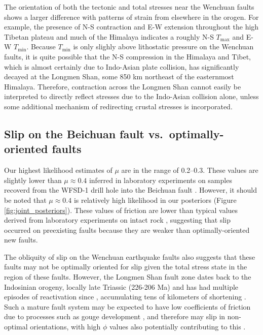 \documentclass[twocolumn,jgrga]{AGUTeX}
\begin{document}
\begin{article}
The orientation of both the tectonic and total stresses near the
Wenchuan faults shows a larger difference with patterns of strain from
elsewhere in the orogen. For example, the presence of N-S contraction
and E-W extension throughout the high Tibetan plateau and much of the
Himalaya \citep[e.g.,][]{armijo1986, molnar1988, taylor2003} indicates a
roughly N-S $T_{\mathrm{max}}$ and E-W $T_{\mathrm{min}}$. Because
$T_{\mathrm{min}}$ is only slighly above lithostatic pressure on the
Wenchuan faults, it is quite possible that the N-S compression in the
Himalaya and Tibet, which is almost certainly due to Indo-Asian plate
collision, has significantly decayed at the Longmen Shan, some 850
km northeast of the easternmost Himalaya. Therefore, contraction across
the Longmen Shan cannot easily be interpreted to directly reflect
stresses due to the Indo-Asian collision alone, unless some additional
mechanism of redirecting crustal stresses is incorporated.

\subsection{Slip on the Beichuan fault vs.~optimally-oriented
faults}\label{slip-on-the-beichuan-fault-vs.optimally-oriented-faults}

Our highest likelihood estimates of $\mu$ are in the range of 0.2--0.3.
These values are slightly lower than $\mu \approx 0.4$ inferred in
laboratory experiments on samples recoverd from the WFSD-1 drill hole
into the Beichuan fault \citep{kuo2014}. However, it should be noted that
$\mu \approx 0.4$ is relatively high likelihood in our posteriors
(Figure \ref{fig:joint_posteriors}). These values of friction 
are lower than typical values derived from laboratory experiments on
intact rock \citep[e.g.,][]{byerlee1978}, suggesting that slip occurred on
preexisting faults because they are weaker than optimally-oriented new
faults.

The obliquity of slip on the Wenchuan earthquake faults also suggests
that these faults may not be optimally oriented for slip given the total
stress state in the region of these faults. However, the Longmen Shan
fault zone dates back to the Indosinian orogeny, locally late Triassic
(226-206 Ma) \citep{yong2003} and has had multiple episodes of
reactivation since \citep[e.g.,][]{burchfiel1995, wang2012}, accumulating
tens of kilometers of shortening \citep[e.g.,][]{hubbard2010}. Such a mature
fault system may be expected to have low coefficients of friction due to
processes such as gouge development \citep[e.g.,][]{kuo2014}, and therefore
may slip in non-optimal orientations, with high $\phi$ values also
potentially contributing to this \citep[e.g.,][]{sibson1985}.


\end{article}
\end{document}

